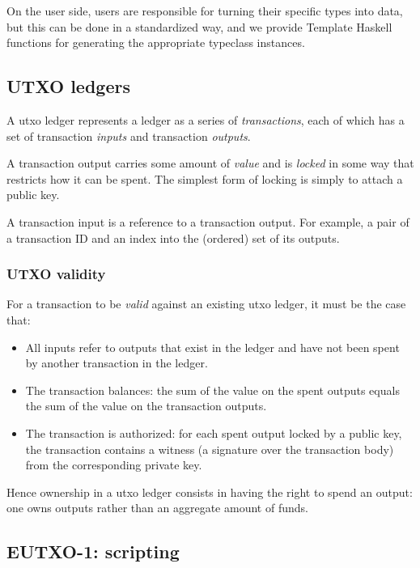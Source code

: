 On the user side, users are responsible for turning their specific types into \gls{data}, but this can be done in a standardized way, and we provide Template Haskell functions for generating the appropriate typeclass instances.

\subsection{UTXO ledgers}

A \gls{utxo} ledger represents a ledger as a series of \emph{transactions}, each of which has a set of transaction \emph{inputs} and transaction \emph{outputs}.

A transaction output carries some amount of \emph{value} and is \emph{locked} in some way that restricts how it can be spent.
The simplest form of locking is simply to attach a public key.

A transaction input is a reference to a transaction output.
For example, a pair of a transaction ID and an index into the (ordered) set of its outputs.

\subsubsection{UTXO validity}
\label{sec:utxo-valid}

For a transaction to be \emph{valid} against an existing \gls{utxo} ledger, it must be the case that:
\begin{itemize}
\item All inputs refer to outputs that exist in the ledger and have not been spent by another transaction in the ledger.
\item The transaction balances: the sum of the value on the spent outputs equals the sum of the value on the transaction outputs.
\item The transaction is authorized: for each spent output locked by a public key, the transaction contains a witness (a signature over the transaction body) from the corresponding private key.
\end{itemize}
\medskip

Hence ownership in a \gls{utxo} ledger consists in having the right to spend an output: one owns outputs rather than an aggregate amount of funds.

\subsection{EUTXO-1: scripting}
\label{sec:eutxo}

